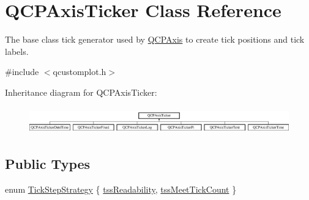 \hypertarget{class_q_c_p_axis_ticker}{}\section{Q\+C\+P\+Axis\+Ticker Class Reference}
\label{class_q_c_p_axis_ticker}


The base class tick generator used by \mbox{\hyperlink{class_q_c_p_axis}{Q\+C\+P\+Axis}} to create tick positions and tick labels.  




{\ttfamily \#include $<$qcustomplot.\+h$>$}

Inheritance diagram for Q\+C\+P\+Axis\+Ticker\+:\begin{figure}[H]
\begin{center}
\leavevmode
\includegraphics[height=1.181435cm]{d9/d25/class_q_c_p_axis_ticker}
\end{center}
\end{figure}
\subsection*{Public Types}
\begin{DoxyCompactItemize}
\item 
enum \mbox{\hyperlink{class_q_c_p_axis_ticker_ab6d2f9d9477821623ac9bc4b21ddf49a}{Tick\+Step\+Strategy}} \{ \mbox{\hyperlink{class_q_c_p_axis_ticker_ab6d2f9d9477821623ac9bc4b21ddf49aa9002aa2fd5633ab5556c71a26fed63a8}{tss\+Readability}}, 
\mbox{\hyperlink{class_q_c_p_axis_ticker_ab6d2f9d9477821623ac9bc4b21ddf49aa770312b6b9b0c64a37ceeba96e0cd7f2}{tss\+Meet\+Tick\+Count}}
 \}
\end{DoxyCompactItemize}
